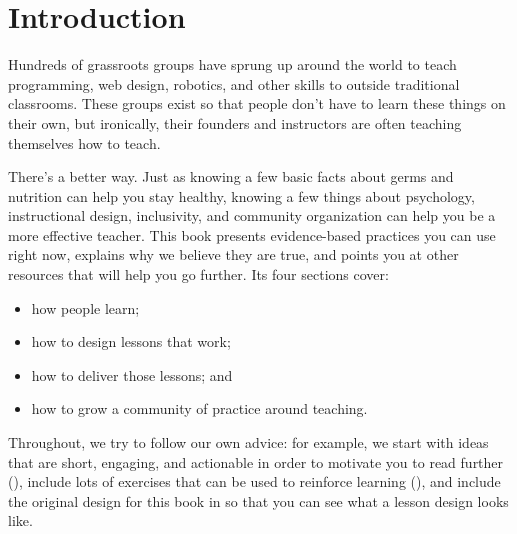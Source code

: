 \chapter{Introduction}\label{s:intro}

Hundreds of grassroots groups have sprung up around the world to teach
programming, web design, robotics, and other skills to
 outside
traditional classrooms.  These groups exist so that people don't have
to learn these things on their own, but ironically, their founders and
instructors are often teaching themselves how to teach.

There's a better way. Just as knowing a few basic facts about germs
and nutrition can help you stay healthy, knowing a few things about
psychology, instructional design, inclusivity, and community
organization can help you be a more effective teacher. This book
presents evidence-based practices you can use right now, explains why
we believe they are true, and points you at other resources that will
help you go further.  Its four sections cover:

\begin{itemize}

\item
  how people learn;

\item
  how to design lessons that work;

\item
  how to deliver those lessons; and

\item
  how to grow a community of practice around teaching.

\end{itemize}

\noindent
Throughout, we try to follow our own advice: for example, we start
with ideas that are short, engaging, and actionable in order to
motivate you to read further (), include lots of
exercises that can be used to reinforce learning (),
and include the original design for this book in  so that
you can see what a lesson design looks like.

